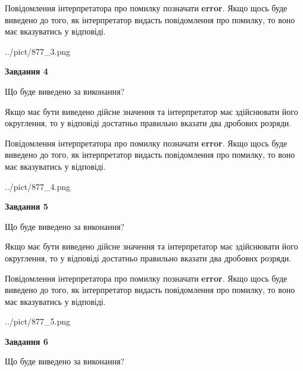 \documentclass[12pt, ukrainian]{article}
\begin{document}
{\begin {Large}
Повідомлення інтерпретатора про помилку позначати \textbf{error}.
Якщо щось буде виведено до того, як інтерпретатор видасть повідомлення про помилку, 
то воно має вказуватись у відповіді. \par

\begin{center}
	{../pict/877_3.png}
\end{center}
\newpage

{\begin {center}\textbf{Завдання 4}\end {center}}\par
Що буде виведено за виконання? \par

Якщо має бути виведено дійсне значення та інтерпретатор має здійснювати його округлення, 
то у відповіді достатньо правильно вказати два дробових розряди.

Повідомлення інтерпретатора про помилку позначати \textbf{error}.
Якщо щось буде виведено до того, як інтерпретатор видасть повідомлення про помилку, 
то воно має вказуватись у відповіді. \par

\begin{center}
	{../pict/877_4.png}
\end{center}
\newpage

{\begin {center}\textbf{Завдання 5}\end {center}}\par
Що буде виведено за виконання? \par

Якщо має бути виведено дійсне значення та інтерпретатор має здійснювати його округлення, 
то у відповіді достатньо правильно вказати два дробових розряди.

Повідомлення інтерпретатора про помилку позначати \textbf{error}.
Якщо щось буде виведено до того, як інтерпретатор видасть повідомлення про помилку, 
то воно має вказуватись у відповіді. \par

\begin{center}
	{../pict/877_5.png}
\end{center}
\newpage

{\begin {center}\textbf{Завдання 6}\end {center}}\par
Що буде виведено за виконання? \par


\end{Large}}
\end{document}
